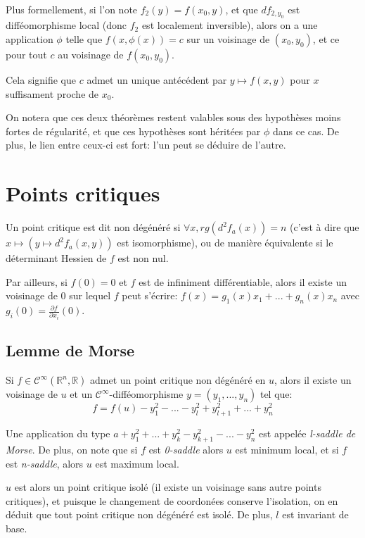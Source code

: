 \documentclass{article}
\begin{document}
Plus formellement, si l'on note $f_2(y) = f(x_0, y)$, et que $df_{2,y_0}$ est difféomorphisme local (donc $f_2$ est localement inversible), alors on a une application $\phi$ telle que $f(x,\phi(x))=c$ sur un voisinage de $(x_0,y_0)$, et ce pour tout $c$ au voisinage de $f(x_0,y_0)$.

Cela signifie que $c$ admet un unique antécédent par $y\mapsto f(x,y)$ pour $x$ suffisament proche de $x_0$.

\bigskip

On notera que ces deux théorèmes restent valables sous des hypothèses moins fortes de régularité, et que ces hypothèses sont héritées par $\phi$ dans ce cas. De plus, le lien entre ceux-ci est fort: l'un peut se déduire de l'autre.

\section{Points critiques}

Un point critique est dit non dégénéré si $\forall x, rg(d^2f_a(x))=n$ (c'est à dire que $x\mapsto(y\mapsto d^2f_a(x,y))$ est isomorphisme), ou de manière équivalente si le déterminant Hessien de $f$ est non nul.

Par ailleurs, si $f(0)=0$ et $f$ est de infiniment différentiable, alors il existe un voisinage de 0 sur lequel $f$ peut s'écrire: $f(x)=g_1(x)x_1+...+g_n(x)x_n$ avec $g_i(0) = \frac{\partial f}{\partial x_i}(0)$.

\subsection{Lemme de Morse}

Si $f\in\mathcal{C}^\infty(\mathbb{R}^n,\mathbb{R})$ admet un point critique non dégénéré en $u$, alors il existe un voisinage de $u$ et un $\mathcal{C}^\infty$-difféomorphisme $y=(y_1,...,y_n)$ tel que: $$f=f(u)-y_1^2-...-y_l^2+y_{l+1}^2+...+y_n^2$$

Une application du type $a+y_1^2+...+y_k^2-y_{k+1}^2-...-y_n^2$ est appelée \textit{l-saddle de Morse}. De plus, on note que si $f$ est \textit{0-saddle} alors $u$ est minimum local, et si $f$ est \textit{n-saddle}, alors $u$ est maximum local.

$u$ est alors un point critique isolé (il existe un voisinage sans autre points critiques), et puisque le changement de coordonées conserve l'isolation, on en déduit que tout point critique non dégénéré est isolé. De plus, $l$ est invariant de base.
\end{document}
